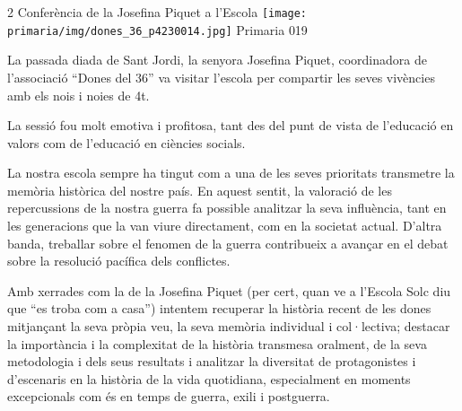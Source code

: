 \begin{news}
{2} %
{Conferència de la Josefina Piquet a l'Escola}
{\noindent\texttt{[image: primaria/img/dones\_36\_p4230014.jpg]}}
{Primaria}
{019} %




La passada diada de Sant Jordi, la senyora Josefina Piquet, coordinadora de l'associació “Dones del 36” va visitar l'escola per compartir les seves vivències amb els nois i noies de 4t.

La sessió fou molt emotiva i profitosa, tant des del punt de vista de l'educació en valors com de l'educació en ciències socials.

La nostra escola sempre ha tingut com a una de les seves prioritats transmetre  la memòria històrica del nostre país. En aquest sentit, la valoració de les repercussions de la nostra guerra fa possible analitzar la seva influència, tant en les generacions que la van viure directament, com en la societat actual. D'altra banda, treballar sobre el fenomen de la guerra contribueix a avançar en el debat sobre la resolució pacífica dels conflictes.

Amb xerrades com la de la Josefina Piquet (per cert, quan ve a l'Escola Solc diu que “es troba com a casa”) intentem recuperar la història recent de les dones mitjançant la seva pròpia veu, la seva memòria individual i col·lectiva; destacar la importància i la complexitat de la història transmesa oralment, de la seva metodologia i dels seus resultats i analitzar la diversitat de protagonistes i d'escenaris en la història de la vida quotidiana, especialment en moments excepcionals com és en temps de guerra, exili i postguerra. 

\end{news}

\newssep
